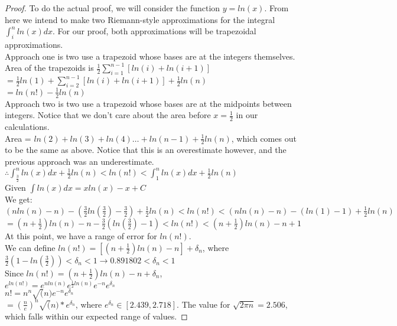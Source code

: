 \begin{proof}
To do the actual proof, we will consider the function $y=ln(x)$. From here we intend to make two Riemann-style approximations for the integral $\int_{i}^{n}{ln(x)dx}$. For our proof, both approximations will be trapezoidal approximations. \\

Approach one is two use a trapezoid whose bases are at the integers themselves.\\

Area of the trapezoids is $\frac{1}{2}\sum_{i=1}^{n-1}{[ln(i)+ln(i+1)]}$\\
$=\frac{1}{2}ln(1)+\sum_{i=2}^{n-1}{[ln(i)+ln(i+1)]}+\frac{1}{2}ln(n)$\\
$=ln(n!)-\frac{1}{2}ln(n)$\\

Approach two is two use a trapezoid whose bases are at the midpoints between integers. Notice that we don't care about the area before $x=\frac{1}{2}$ in our calculations.\\ 

Area = $ln(2)+ln(3)+ln(4)\dots+ln(n-1)+\frac{1}{2}ln(n)$, which comes out to be the same as above.  Notice that this is an overestimate however, and the previous approach was an underestimate.\\
$\therefore \int_{\frac{3}{2}}^{n}{ln(x)}dx + \frac{1}{2}ln(n) < ln(n!) < \int_{1}^{n}{ln(x)}dx + \frac{1}{2}ln(n)$\\

Given $\int{ln(x)}dx = xln(x) - x + C$\\

We get:\\
$(nln(n)-n)-(\frac{3}{2}ln(\frac{3}{2}) - \frac{3}{2}) + \frac{1}{2}ln(n) < ln(n!) < (nln(n) - n) - (ln(1) - 1) + \frac{1}{2}ln(n)$\\
$=(n+\frac{1}{2})ln(n)-n-\frac{3}{2}(ln(\frac{3}{2}) - 1) < ln(n!) < (n+\frac{1}{2})ln(n) - n + 1$\\

At this point, we have a range of error for $ln(n!)$.\\

We can define $ln(n!) = [(n+\frac{1}{2})ln(n) - n] + \delta_n$, where $\frac{3}{2}(1-ln(\frac{3}{2})) < \delta_n < 1 \longrightarrow 0.891802 < \delta_n < 1$\\

Since $ln(n!) = (n+\frac{1}{2})ln(n) - n + \delta_n$,\\
$e^{ln(n!)} = e^{nln(n)}e^{\frac{1}{2}ln(n)}e^{-n}e^{\delta_n}$\\
$n! = n^n \sqrt(n) e^{-n}e^{\delta_n}$\\
$=(\frac{n}{e})^n \sqrt(n) * e^{\delta_n}$, where $e^{\delta_n} \in [2.439, 2.718]$. The value for $\sqrt{2 \pi n} = 2.506$, which falls within our expected range of values.

\end{proof}

